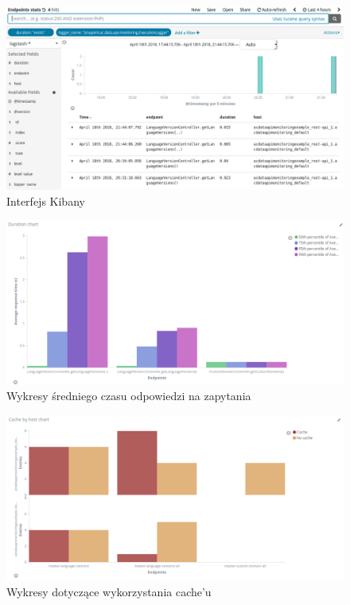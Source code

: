 \documentclass[licencjacka]{pracamgr}
\begin{document}
\begin{figure}[h]
	\includegraphics[scale=0.38]{images/kibana2.png}
	\caption{Interfejs Kibany}
\end{figure}
\begin{figure}[h]
	\centering
	\includegraphics[scale=0.38]{images/kibana3.png}
	\caption{Wykresy średniego czasu odpowiedzi na zapytania}
\end{figure}
\begin{figure}[h]
	\centering
	\includegraphics[scale=0.38]{images/kibana4.png}
	\caption{Wykresy dotyczące wykorzystania cache'u}
\end{figure}
\end{document}
